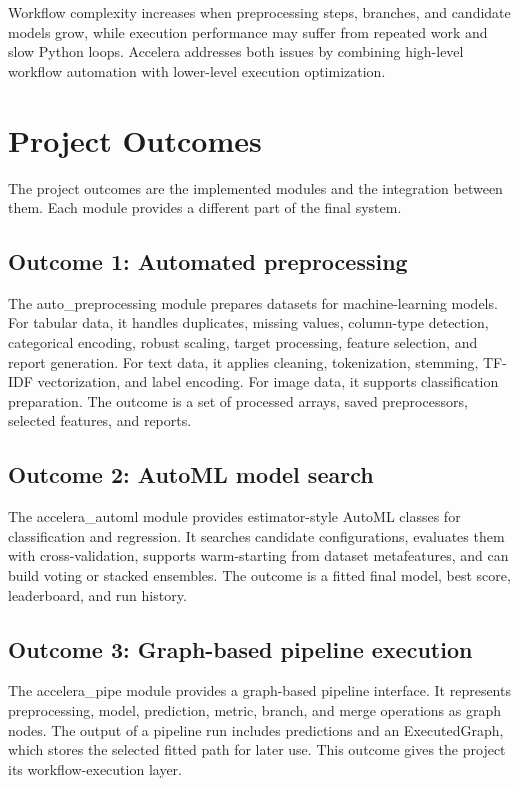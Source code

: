 \documentclass[12pt,a4paper]{report}
\begin{document}
Workflow complexity increases when preprocessing steps, branches, and candidate
models grow, while execution performance may suffer from repeated work and slow
Python loops. Accelera addresses both issues by combining high-level workflow
automation with lower-level execution optimization.

\section{Project Outcomes}

The project outcomes are the implemented modules and the integration between
them. Each module provides a different part of the final system.

\subsection*{Outcome 1: Automated preprocessing}

The auto\_preprocessing module prepares datasets for machine-learning
models. For tabular data, it handles duplicates, missing values, column-type
detection, categorical encoding, robust scaling, target processing, feature
selection, and report generation. For text data, it applies cleaning,
tokenization, stemming, TF-IDF vectorization, and label encoding. For image
data, it supports classification preparation. The outcome is a
set of processed arrays, saved preprocessors, selected features, and reports.

\subsection*{Outcome 2: AutoML model search}

The accelera\_automl module provides estimator-style AutoML classes for
classification and regression. It searches candidate configurations, evaluates
them with cross-validation, supports warm-starting from dataset metafeatures,
and can build voting or stacked ensembles. The outcome is a fitted final model,
best score, leaderboard, and run history.

\subsection*{Outcome 3: Graph-based pipeline execution}

The accelera\_pipe module provides a graph-based pipeline interface.
It represents preprocessing, model, prediction, metric, branch, and merge
operations as graph nodes. The output of a pipeline run includes predictions and
an ExecutedGraph, which stores the selected fitted path for later use.
This outcome gives the project its workflow-execution layer.
\end{document}
